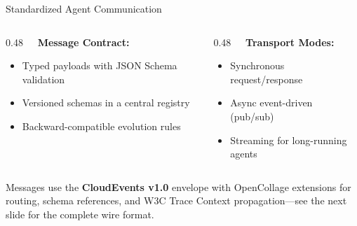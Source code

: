 \begin{frame}{Standardized Agent Communication}
  \vspace{-0.2cm}

  \fontsize{6}{7}\selectfont
  \begin{columns}[T]
    \begin{column}{0.48\textwidth}
      \textbf{\faEnvelope\ \ Message Contract:}
      \begin{itemize}
        \item Typed payloads with JSON Schema validation
        \item Versioned schemas in a central registry
        \item Backward-compatible evolution rules
      \end{itemize}
    \end{column}
    \begin{column}{0.48\textwidth}
      \textbf{\faBolt\ \ Transport Modes:}
      \begin{itemize}
        \item Synchronous request/response
        \item Async event-driven (pub/sub)
        \item Streaming for long-running agents
      \end{itemize}
    \end{column}
  \end{columns}

  \vspace{-0.1cm}

  \begin{exampleblock}{}
    \fontsize{6}{7}\selectfont
    Messages use the \textbf{CloudEvents v1.0} envelope with OpenCollage extensions for
    routing, schema references, and W3C Trace Context propagation---see the next slide
    for the complete wire format.
  \end{exampleblock}
\end{frame}

